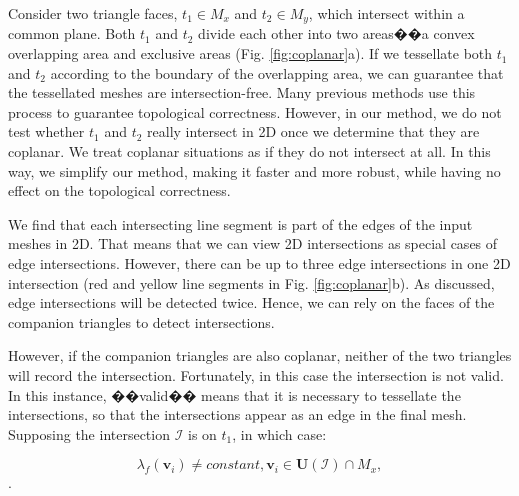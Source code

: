 Consider two triangle faces,  $t_1\in M_x$ and $t_2 \in M_y$, which intersect within a common plane. Both $t_1$ and $t_2$ divide each other into two areas��a convex overlapping area and exclusive areas (Fig. \ref{fig:coplanar}a). If we tessellate both $t_1$ and $t_2$ according to the boundary of the overlapping area, we can guarantee that the tessellated meshes are intersection-free. Many previous methods \cite{feito2013fast,zhou2016mesh} use this process to guarantee topological correctness. However, in our method, we do not test whether $t_1$ and $t_2$ really intersect in 2D once we determine that they are coplanar. We treat coplanar situations as if they do not intersect at all. In this way, we simplify our method, making it faster and more robust, while having no effect on the topological correctness.


We find that each intersecting line segment is part of the edges of the input meshes in 2D. That means that we can view 2D intersections as special cases of edge intersections. However, there can be up to three edge intersections in one 2D intersection (red and yellow line segments in Fig. \ref{fig:coplanar}b). As discussed, edge intersections will be detected twice. Hence, we can rely on the faces of the companion triangles to detect intersections.


However, if the companion triangles are also coplanar, neither of the two triangles will record the intersection. Fortunately, in this case the intersection is not valid. In this instance, ��valid�� means that it is necessary to tessellate the intersections, so that the intersections appear as an edge in the final mesh. Supposing the intersection $\mathcal{I}$ is on $t_1$, in which case:

\begin{equation}
\lambda_f(\bm{v}_i) \neq constant, \bm{v}_i \in \bm{U}(\mathcal{I}) \cap M_x,
\end{equation}
.

